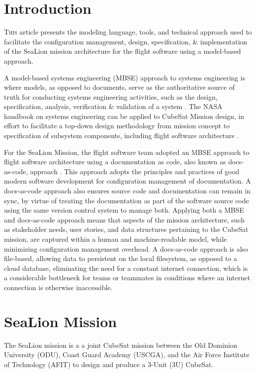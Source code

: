 \documentclass[conf]{new-aiaa}
\begin{document}
\section{Introduction}

\lettrine{T}{his} article presents the modeling language, tools, and technical approach used to facilitate the configuration management, design, specification, \& implementation of the SeaLion mission architecture for the flight software using a model-based approach.

A model-based systems engineering (MBSE) approach to systems engineering is where models, as opposed to documents, serve as the authoritative source of truth for conducting systems engineering activities, such as the design, specification, analysis, verification \& validation of a system \cite{architecting_spacecraft}. The NASA handbook on systems engineering can be applied to CubeSat Mission design, in effort to facilitate a top-down design methodology from mission concept to specification of subsystem components, including flight software architecture \cite{asundi13_cubes}.

For the SeaLion Mission, the flight software team adopted an MBSE approach to flight software architecture using a documentation as code, also known as docs-as-code, approach \cite{docs_as_code}. This approach adopts the principles and practices of good modern software development for configuration management of documentation. A docs-as-code approach also ensures source code and documentation can remain in sync, by virtue of treating the documentation as part of the software source code using the same version control system to manage both. Applying both a MBSE and docs-as-code approach means that aspects of the mission architecture, such as stakeholder needs, user stories, and data structures pertaining to the CubeSat mission, are captured within a human and machine-readable model, while minimizing configuration management overhead. A docs-as-code approach is also file-based, allowing data to persistent on the local filesystem, as opposed to a cloud database, eliminating the need for a constant internet connection, which is a considerable bottleneck for teams or teammates in conditions where an internet connection is otherwise inaccessible.


\section{SeaLion Mission}

The SeaLion mission is a a joint CubeSat mission between the Old Dominion University (ODU), Coast Guard Academy (USCGA), and the Air Force Institute of Technology (AFIT) to design and produce a 3-Unit (3U) CubeSat.
\end{document}
